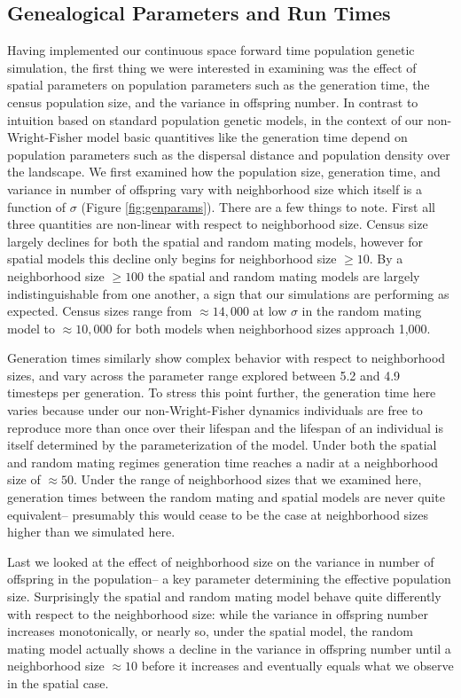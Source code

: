 \documentclass[10pt,twoside,lineno]{gsajnl}
\begin{document}
\subsection{Genealogical Parameters and Run Times}
Having implemented our continuous space forward time population genetic simulation, the first thing we were interested in examining was the effect of spatial parameters on population parameters such as the generation time, the census population size, and the variance in offspring number. In contrast to intuition based on standard population genetic models, in the context of our non-Wright-Fisher model basic quantitives like the generation time depend on population parameters such as the dispersal distance and population density over the landscape. We first examined how the population size, generation time, and  variance in number of offspring vary with neighborhood size which itself is a function of $\sigma$ (Figure \ref{fig:genparams}). There are a few things to note. First all three quantities are non-linear with respect to neighborhood size. Census size largely declines for both the spatial and random mating models, however for spatial models this decline only begins for neighborhood size $\geq 10$. By a neighborhood size $\geq 100$ the spatial and random mating models are largely indistinguishable from one another, a sign that our simulations are performing as expected. Census sizes range from $\approx 14,000$ at low $\sigma$ in the random mating model to $\approx 10,000$ for both models when neighborhood sizes approach 1,000.

Generation times similarly show complex behavior with respect to neighborhood sizes, and vary across the parameter range explored between 5.2 and 4.9 timesteps per generation. To stress this point further, the generation time here varies because under our non-Wright-Fisher dynamics individuals are free to reproduce more than once over their lifespan and the lifespan of an individual is itself determined by the parameterization of the model. Under both the spatial and random mating regimes generation time reaches a nadir at a neighborhood size of $\approx 50$. Under the range of neighborhood sizes that we examined here, generation times between the random mating and spatial models are never quite equivalent-- presumably this would cease to be the case at neighborhood sizes higher than we simulated here.

Last we looked at the effect of neighborhood size on the variance in number of offspring in the population-- a key parameter determining the effective population size. Surprisingly the spatial and random mating model behave quite differently with respect to the neighborhood size: while the variance in offspring number increases monotonically, or nearly so, under the spatial model, the random mating model actually shows a decline in the variance in offspring number until a neighborhood size $\approx 10$ before it increases and eventually equals what we observe in the spatial case. 
\end{document}
